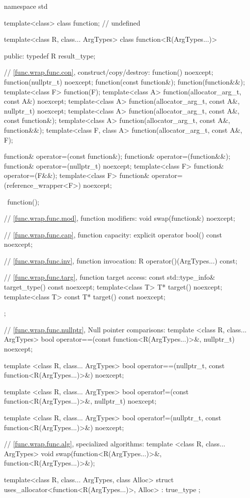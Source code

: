 \begin{codeblock}
namespace std {
  template<class> class function; // undefined

  template<class R, class... ArgTypes>
  class function<R(ArgTypes...)> {
  public:
    typedef R result_type;

    // \ref{func.wrap.func.con}, construct/copy/destroy:
    function() noexcept;
    function(nullptr_t) noexcept;
    function(const function&);
    function(function&&);
    template<class F> function(F);
    template<class A> function(allocator_arg_t, const A&) noexcept;
    template<class A> function(allocator_arg_t, const A&,
      nullptr_t) noexcept;
    template<class A> function(allocator_arg_t, const A&,
      const function&);
    template<class A> function(allocator_arg_t, const A&,
      function&&);
    template<class F, class A> function(allocator_arg_t, const A&, F);

    function& operator=(const function&);
    function& operator=(function&&);
    function& operator=(nullptr_t) noexcept;
    template<class F> function& operator=(F&&);
    template<class F> function& operator=(reference_wrapper<F>) noexcept;

    ~function();

    // \ref{func.wrap.func.mod}, function modifiers:
    void swap(function&) noexcept;

    // \ref{func.wrap.func.cap}, function capacity:
    explicit operator bool() const noexcept;

    // \ref{func.wrap.func.inv}, function invocation:
    R operator()(ArgTypes...) const;

    // \ref{func.wrap.func.targ}, function target access:
    const std::type_info& target_type() const noexcept;
    template<class T>       T* target() noexcept;
    template<class T> const T* target() const noexcept;

  };

  // \ref{func.wrap.func.nullptr}, Null pointer comparisons:
  template <class R, class... ArgTypes>
    bool operator==(const function<R(ArgTypes...)>&, nullptr_t) noexcept;

  template <class R, class... ArgTypes>
    bool operator==(nullptr_t, const function<R(ArgTypes...)>&) noexcept;

  template <class R, class... ArgTypes>
    bool operator!=(const function<R(ArgTypes...)>&, nullptr_t) noexcept;

  template <class R, class... ArgTypes>
    bool operator!=(nullptr_t, const function<R(ArgTypes...)>&) noexcept;

  // \ref{func.wrap.func.alg}, specialized algorithms:
  template <class R, class... ArgTypes>
    void swap(function<R(ArgTypes...)>&, function<R(ArgTypes...)>&);

  template<class R, class... ArgTypes, class Alloc>
    struct uses_allocator<function<R(ArgTypes...)>, Alloc>
      : true_type { };
}
\end{codeblock}

